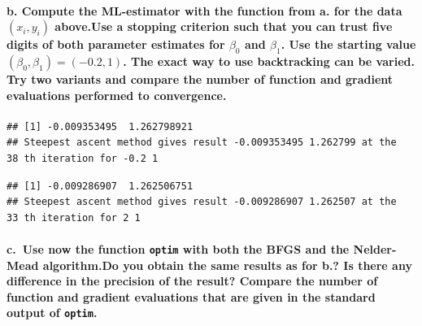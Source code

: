 \documentclass[
]{article}
\begin{document}
\paragraph{\texorpdfstring{b. Compute the ML-estimator with the function
from a. for the data \((x_i, y_i)\) above.Use a stopping criterion such
that you can trust five digits of both parameter estimates for
\(\beta_0\) and \(\beta_1\). Use the starting value
\((\beta_0, \beta_1) = (-0.2, 1)\). The exact way to use backtracking
can be varied. Try two variants and compare the number of function and
gradient evaluations performed to
convergence.}{b. Compute the ML-estimator with the function from a. for the data (x\_i, y\_i) above.Use a stopping criterion such that you can trust five digits of both parameter estimates for \textbackslash beta\_0 and \textbackslash beta\_1. Use the starting value (\textbackslash beta\_0, \textbackslash beta\_1) = (-0.2, 1). The exact way to use backtracking can be varied. Try two variants and compare the number of function and gradient evaluations performed to convergence.}}\label{b.-compute-the-ml-estimator-with-the-function-from-a.-for-the-data-x_i-y_i-above.use-a-stopping-criterion-such-that-you-can-trust-five-digits-of-both-parameter-estimates-for-beta_0-and-beta_1.-use-the-starting-value-beta_0-beta_1--0.2-1.-the-exact-way-to-use-backtracking-can-be-varied.-try-two-variants-and-compare-the-number-of-function-and-gradient-evaluations-performed-to-convergence.}

\begin{verbatim}
## [1] -0.009353495  1.262798921
## Steepest ascent method gives result -0.009353495 1.262799 at the  38 th iteration for -0.2 1
\end{verbatim}

\begin{verbatim}
## [1] -0.009286907  1.262506751
## Steepest ascent method gives result -0.009286907 1.262507 at the  33 th iteration for 2 1
\end{verbatim}

\paragraph{\texorpdfstring{c.~Use now the function \texttt{optim} with
both the BFGS and the Nelder-Mead algorithm.Do you obtain the same
results as for b.? Is there any difference in the precision of the
result? Compare the number of function and gradient evaluations that are
given in the standard output of
\texttt{optim}.}{c.~Use now the function optim with both the BFGS and the Nelder-Mead algorithm.Do you obtain the same results as for b.? Is there any difference in the precision of the result? Compare the number of function and gradient evaluations that are given in the standard output of optim.}}\label{c.-use-now-the-function-optim-with-both-the-bfgs-and-the-nelder-mead-algorithm.do-you-obtain-the-same-results-as-for-b.-is-there-any-difference-in-the-precision-of-the-result-compare-the-number-of-function-and-gradient-evaluations-that-are-given-in-the-standard-output-of-optim.}
\end{document}

